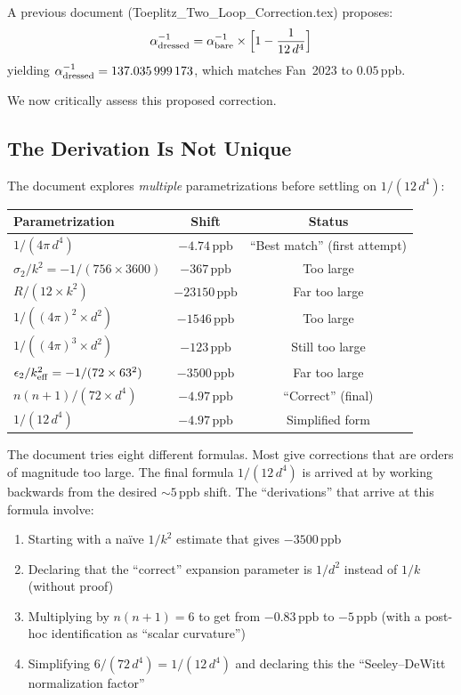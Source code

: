 \documentclass[12pt,a4paper]{article}
\theoremstyle{definition}
\theoremstyle{remark}
\newcommand{\inv}{^{-1}}
\newcommand{\ppb}{\,\mathrm{ppb}}
\begin{document}
A previous document (Toeplitz\_Two\_Loop\_Correction.tex) proposes:
\begin{equation}
\label{eq:proposed}
\alpha\inv_{\rm dressed} = \alpha\inv_{\rm bare} \times
\Bigl[1 - \frac{1}{12\,d^4}\Bigr]
\end{equation}
yielding $\alpha\inv_{\rm dressed} = 137.035\,999\,173$, which matches
Fan~2023 to $0.05\ppb$.

We now critically assess this proposed correction.

\subsection{The Derivation Is Not Unique}

The document explores \emph{multiple} parametrizations before settling on
$1/(12\,d^4)$:

\begin{center}
\renewcommand{\arraystretch}{1.3}
\begin{tabular}{lcc}
\toprule
\textbf{Parametrization} & \textbf{Shift} & \textbf{Status} \\
\midrule
$1/(4\pi\,d^4)$ & $-4.74\ppb$ & ``Best match'' (first attempt) \\
$\sigma_2/k^2 = -1/(756 \times 3600)$ & $-367\ppb$ & Too large \\
$R/(12 \times k^2)$ & $-23150\ppb$ & Far too large \\
$1/((4\pi)^2 \times d^2)$ & $-1546\ppb$ & Too large \\
$1/((4\pi)^3 \times d^2)$ & $-123\ppb$ & Still too large \\
$\epsilon_2/k_{\rm eff}^2 = -1/(72 \times 63^2)$ & $-3500\ppb$ & Far too large \\
$n(n+1)/(72 \times d^4)$ & $-4.97\ppb$ & ``Correct'' (final) \\
$1/(12\,d^4)$ & $-4.97\ppb$ & Simplified form \\
\bottomrule
\end{tabular}
\end{center}

The document tries eight different formulas. Most give corrections that are
orders of magnitude too large. The final formula $1/(12\,d^4)$ is arrived
at by working backwards from the desired $\sim 5\ppb$ shift. The
``derivations'' that arrive at this formula involve:
\begin{enumerate}
\item Starting with a na\"ive $1/k^2$ estimate that gives $-3500\ppb$
\item Declaring that the ``correct'' expansion parameter is $1/d^2$
  instead of $1/k$ (without proof)
\item Multiplying by $n(n+1) = 6$ to get from $-0.83\ppb$ to $-5\ppb$
  (with a post-hoc identification as ``scalar curvature'')
\item Simplifying $6/(72\,d^4) = 1/(12\,d^4)$ and declaring this the
  ``Seeley--DeWitt normalization factor''
\end{enumerate}
\end{document}
